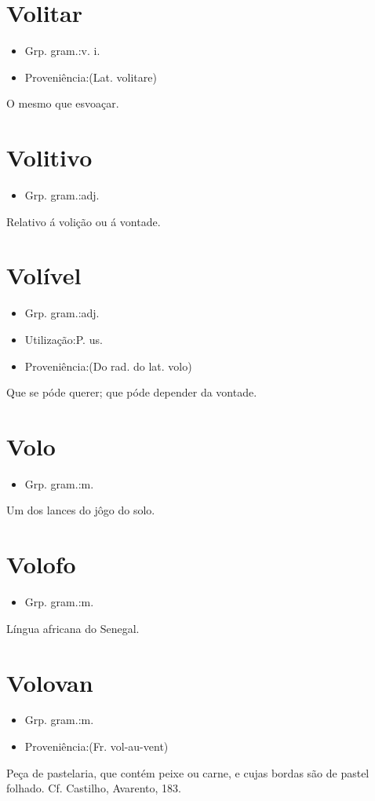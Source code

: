 \documentclass{article}
\begin{document}
\section{Volitar}
\begin{itemize}
\item {Grp. gram.:v. i.}
\end{itemize}
\begin{itemize}
\item {Proveniência:(Lat. \textunderscore volitare\textunderscore )}
\end{itemize}
O mesmo que \textunderscore esvoaçar\textunderscore .
\section{Volitivo}
\begin{itemize}
\item {Grp. gram.:adj.}
\end{itemize}
Relativo á volição ou á vontade.
\section{Volível}
\begin{itemize}
\item {Grp. gram.:adj.}
\end{itemize}
\begin{itemize}
\item {Utilização:P. us.}
\end{itemize}
\begin{itemize}
\item {Proveniência:(Do rad. do lat. \textunderscore volo\textunderscore )}
\end{itemize}
Que se póde querer; que póde depender da vontade.
\section{Volo}
\begin{itemize}
\item {Grp. gram.:m.}
\end{itemize}
Um dos lances do jôgo do solo.
\section{Volofo}
\begin{itemize}
\item {Grp. gram.:m.}
\end{itemize}
Língua africana do Senegal.
\section{Volovan}
\begin{itemize}
\item {Grp. gram.:m.}
\end{itemize}
\begin{itemize}
\item {Proveniência:(Fr. \textunderscore vol-au-vent\textunderscore )}
\end{itemize}
Peça de pastelaria, que contém peixe ou carne, e cujas bordas são de pastel folhado. Cf. Castilho, \textunderscore Avarento\textunderscore , 183.
\end{document}
